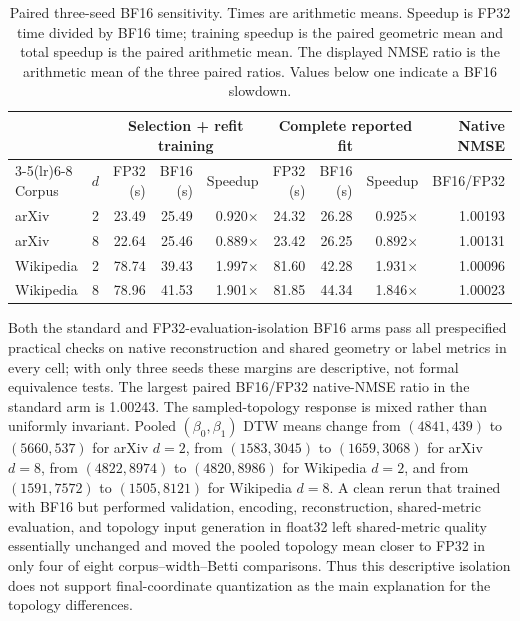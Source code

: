 \documentclass[10pt]{article}
\begin{document}
\begin{table}[ht]
\centering
\scriptsize
\setlength{\tabcolsep}{3.7pt}
\begin{tabular}{lrrrrrrrr}
\toprule
& & \multicolumn{3}{c}{Selection + refit training} &
\multicolumn{3}{c}{Complete reported fit} & Native NMSE\\
\cmidrule(lr){3-5}\cmidrule(lr){6-8}
Corpus & $d$ & FP32 (s) & BF16 (s) & Speedup & FP32 (s) & BF16 (s) & Speedup & BF16/FP32\\
\midrule
arXiv & 2 & 23.49 & 25.49 & 0.920$\times$ & 24.32 & 26.28 & 0.925$\times$ & 1.00193\\
arXiv & 8 & 22.64 & 25.46 & 0.889$\times$ & 23.42 & 26.25 & 0.892$\times$ & 1.00131\\
Wikipedia & 2 & 78.74 & 39.43 & 1.997$\times$ & 81.60 & 42.28 & 1.931$\times$ & 1.00096\\
Wikipedia & 8 & 78.96 & 41.53 & 1.901$\times$ & 81.85 & 44.34 & 1.846$\times$ & 1.00023\\
\bottomrule
\end{tabular}
\caption{Paired three-seed BF16 sensitivity.  Times are arithmetic means.  Speedup is
FP32 time divided by BF16 time; training speedup is the paired geometric mean and total
speedup is the paired arithmetic mean.  The displayed NMSE ratio is the arithmetic mean
of the three paired ratios.  Values below one indicate a BF16 slowdown.}
\label{tab:bf16}
\end{table}

Both the standard and FP32-evaluation-isolation BF16 arms pass all prespecified practical
checks on native reconstruction and shared geometry or label metrics in every cell; with
only three seeds these margins are descriptive, not formal equivalence tests.  The
largest paired BF16/FP32 native-NMSE ratio in the standard arm is 1.00243.
The sampled-topology response is mixed rather than uniformly invariant.  Pooled
$(\beta_0,\beta_1)$ DTW means change from $(4841,439)$ to $(5660,537)$ for arXiv
$d=2$, from $(1583,3045)$ to $(1659,3068)$ for arXiv $d=8$, from $(4822,8974)$ to
$(4820,8986)$ for Wikipedia $d=2$, and from $(1591,7572)$ to $(1505,8121)$ for
Wikipedia $d=8$.  A clean rerun that trained with BF16 but performed validation,
encoding, reconstruction, shared-metric evaluation, and topology input generation in
float32 left shared-metric quality essentially unchanged and moved the pooled topology
mean closer to FP32 in only four of eight corpus--width--Betti comparisons.  Thus
this descriptive isolation does not support final-coordinate quantization as the main
explanation for the topology differences.
\end{document}
